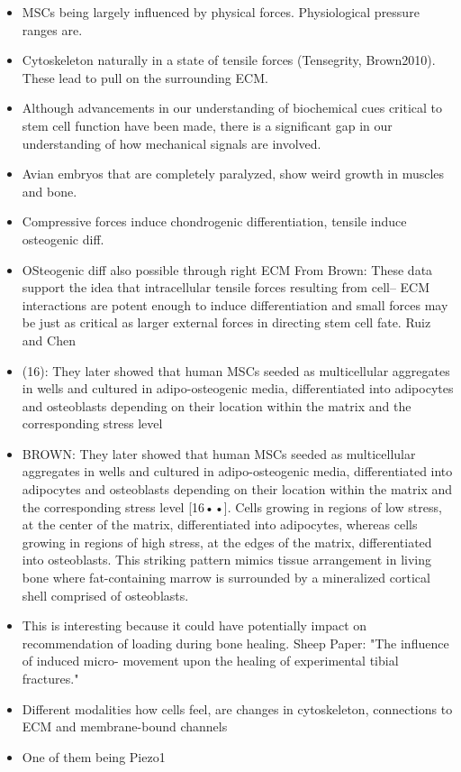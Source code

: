 \begin{itemize}
	\item MSCs being largely influenced by physical forces. Physiological pressure ranges are.
	\item Cytoskeleton naturally in a state of tensile forces (Tensegrity, Brown2010). These lead to pull on the surrounding ECM. 
	\item Although advancements in our understanding of biochemical cues critical to stem cell function have been made, there is a significant gap in our understanding of how mechanical signals are involved.
	\item Avian embryos that are completely paralyzed, show weird growth in muscles and bone.
	\item Compressive forces induce chondrogenic differentiation, tensile induce osteogenic diff.
	\item OSteogenic diff also possible through right ECM From Brown: These data support the idea that intracellular tensile forces resulting from cell– ECM interactions are potent enough to induce differentiation and small forces may be just as critical as larger external forces in directing stem cell fate. Ruiz and Chen
	\item (16): They later showed that human MSCs seeded as multicellular aggregates in wells and cultured in adipo-osteogenic media, differentiated into adipocytes and osteoblasts depending on their location within the matrix and the corresponding stress level	
	\item BROWN: They later showed that human MSCs seeded as multicellular aggregates in wells and cultured in adipo-osteogenic media, differentiated into adipocytes and osteoblasts depending on their location within the matrix and the corresponding stress level [16••]. Cells growing in regions of low stress, at the center of the matrix, differentiated into adipocytes, whereas cells growing in regions of high stress, at the edges of the matrix, differentiated into osteoblasts. This striking pattern mimics tissue arrangement in living bone where fat-containing marrow is surrounded by a mineralized cortical shell comprised of osteoblasts. 
	\item This is interesting because it could have potentially impact on recommendation of loading during bone healing. Sheep Paper: "The influence of induced micro- movement upon the healing of experimental tibial fractures."
	\item Different modalities how cells feel, are changes in cytoskeleton, connections to ECM and membrane-bound channels
	\item One of them being Piezo1	
	
	
\end{itemize}

